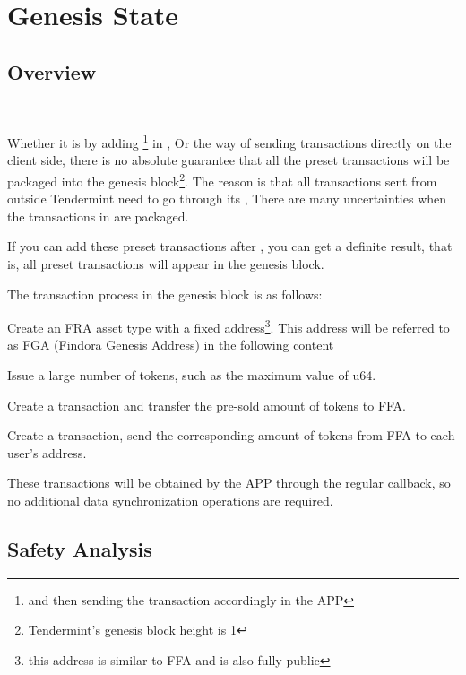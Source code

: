 \clearpage

\section{Genesis State}

\subsection{Overview}

~\par

Whether it is by adding \footnote{and then sending the transaction accordingly in the APP}
in ,
Or the way of sending transactions directly on the client side, there is no absolute guarantee that all the preset
transactions will be packaged into the genesis block\footnote{Tendermint's genesis block height is 1}.
The reason is that all transactions sent from outside Tendermint need to go through its ,
There are many uncertainties when the transactions in  are packaged.

If you can add these preset transactions after , you can get a definite result,
that is, all preset transactions will appear in the genesis block.

The transaction process in the genesis block is as follows:

\begin{ENUMERATE}
    \item Create an FRA asset type with a fixed address\footnote {this address is similar to FFA and is also fully public}.
            This address will be referred to as FGA (Findora Genesis Address) in the following content
    \item Issue a large number of tokens, such as the maximum value of u64.
    \item Create a transaction and transfer the pre-sold amount of tokens to FFA.
    \item Create a transaction, send the corresponding amount of tokens from FFA to each user's address.
    \item These transactions will be obtained by the APP through the regular
             callback, so no additional data synchronization operations are required.
\end{ENUMERATE}

\subsection{Safety Analysis}

